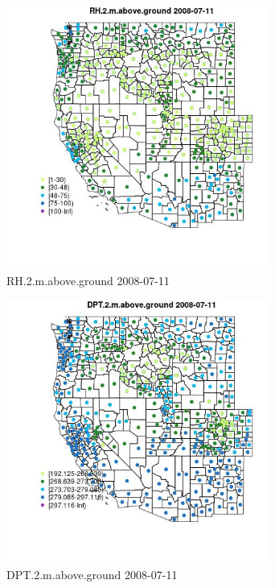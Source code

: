 \begin{figure} 
\centering  
\includegraphics[width=0.77\textwidth]{Code_Outputs/df_report_ML_predictors_CountyCentroid_Locations_Dates_2008-01-01to2018-12-31_MapObsRH2maboveground2008-07-11.jpg} 
\caption{\label{fig:df_report_ML_predictors_CountyCentroid_Locations_Dates_2008-01-01to2018-12-31MapObsRH2maboveground2008-07-11}RH.2.m.above.ground 2008-07-11} 
\end{figure} 
 

\clearpage 

\begin{figure} 
\centering  
\includegraphics[width=0.77\textwidth]{Code_Outputs/df_report_ML_predictors_CountyCentroid_Locations_Dates_2008-01-01to2018-12-31_MapObsDPT2maboveground2008-07-11.jpg} 
\caption{\label{fig:df_report_ML_predictors_CountyCentroid_Locations_Dates_2008-01-01to2018-12-31MapObsDPT2maboveground2008-07-11}DPT.2.m.above.ground 2008-07-11} 
\end{figure} 
 

